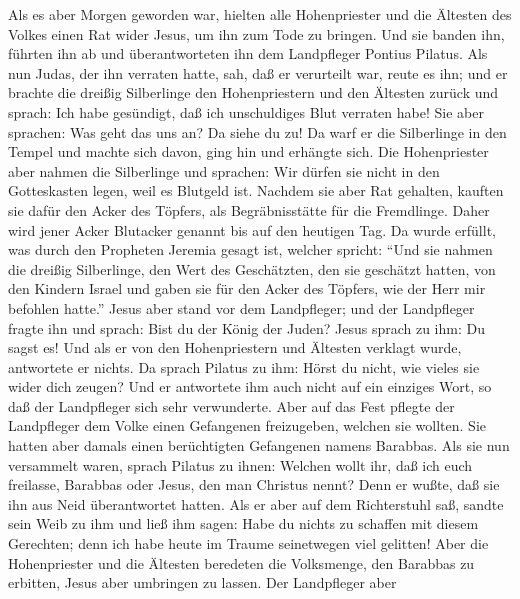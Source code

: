  Als es aber Morgen geworden war, hielten alle
Hohenpriester und die Ältesten des Volkes einen Rat wider Jesus, um ihn
zum Tode zu bringen.  Und sie banden ihn, führten ihn ab
und überantworteten ihn dem Landpfleger Pontius Pilatus. 
Als nun Judas, der ihn verraten hatte, sah, daß er verurteilt war, reute
es ihn; und er brachte die dreißig Silberlinge den Hohenpriestern und
den Ältesten zurück  und sprach: Ich habe gesündigt, daß
ich unschuldiges Blut verraten habe! Sie aber sprachen: Was geht das uns
an? Da siehe du zu!  Da warf er die Silberlinge in den
Tempel und machte sich davon, ging hin und erhängte sich. 
Die Hohenpriester aber nahmen die Silberlinge und sprachen: Wir dürfen
sie nicht in den Gotteskasten legen, weil es Blutgeld ist.
 Nachdem sie aber Rat gehalten, kauften sie dafür den
Acker des Töpfers, als Begräbnisstätte für die Fremdlinge.
 Daher wird jener Acker Blutacker genannt bis auf den
heutigen Tag.  Da wurde erfüllt, was durch den Propheten
Jeremia gesagt ist, welcher spricht: ``Und sie nahmen die dreißig
Silberlinge, den Wert des Geschätzten, den sie geschätzt hatten, von den
Kindern Israel  und gaben sie für den Acker des Töpfers,
wie der Herr mir befohlen hatte.''  Jesus aber stand vor
dem Landpfleger; und der Landpfleger fragte ihn und sprach: Bist du der
König der Juden? Jesus sprach zu ihm: Du sagst es!  Und
als er von den Hohenpriestern und Ältesten verklagt wurde, antwortete er
nichts.  Da sprach Pilatus zu ihm: Hörst du nicht, wie
vieles sie wider dich zeugen?  Und er antwortete ihm auch
nicht auf ein einziges Wort, so daß der Landpfleger sich sehr
verwunderte.  Aber auf das Fest pflegte der Landpfleger
dem Volke einen Gefangenen freizugeben, welchen sie wollten.
 Sie hatten aber damals einen berüchtigten Gefangenen
namens Barabbas.  Als sie nun versammelt waren, sprach
Pilatus zu ihnen: Welchen wollt ihr, daß ich euch freilasse, Barabbas
oder Jesus, den man Christus nennt?  Denn er wußte, daß
sie ihn aus Neid überantwortet hatten.  Als er aber auf
dem Richterstuhl saß, sandte sein Weib zu ihm und ließ ihm sagen: Habe
du nichts zu schaffen mit diesem Gerechten; denn ich habe heute im
Traume seinetwegen viel gelitten!  Aber die Hohenpriester
und die Ältesten beredeten die Volksmenge, den Barabbas zu erbitten,
Jesus aber umbringen zu lassen.  Der Landpfleger aber
